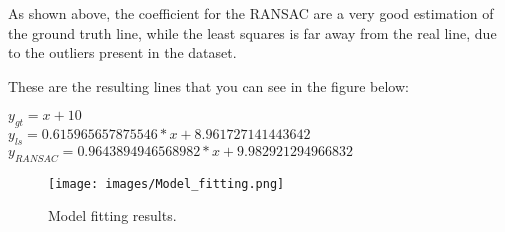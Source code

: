 \documentclass{ETHExercise}
\begin{document}
As shown above, the coefficient for the RANSAC are a very good estimation of the
ground truth line, while the least squares is far away from the real
line, due to the outliers present in the dataset.

These are the resulting lines that you can see in the figure below:
\begin{center}
  $y_{gt} = x + 10$\\
  $y_{ls} = 0.615965657875546 * x + 8.961727141443642 $\\
  $y_{RANSAC} = 0.9643894946568982 * x + 9.982921294966832$
\end{center}

\begin{figure}[!h]
  \texttt{[image: images/Model\_fitting.png]}
  \caption{Model fitting results.}
\end{figure}
\end{document}
